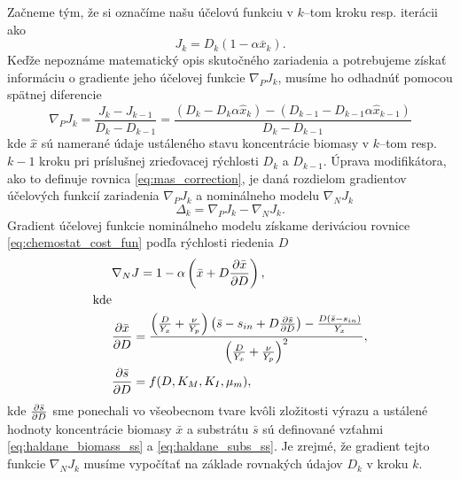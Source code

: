 Začneme tým, že si označíme našu účelovú funkciu v $ k $--tom kroku resp. iterácii ako
\begin{equation}
\label{eq:chemostat_cost_fun}
	J_{k} = D_{k}\left(1-\alpha\bar{x}_{k}\right).
\end{equation}
Keďže nepoznáme matematický opis skutočného zariadenia a potrebujeme získať informáciu o gradiente jeho účelovej funkcie $ \nabla_{P}J_{k} $, musíme ho odhadnúť pomocou spätnej diferencie
\begin{equation}
	\nabla_{P}J_{k} = \frac{J_{k} - J_{k-1}}{D_{k} - D_{k-1}} =
	\frac{\left(D_{k}-D_{k}\alpha\hat{x}_{k}\right) - \left(D_{k-1}-D_{k-1}\alpha\hat{x}_{k-1}\right)}{D_{k} - D_{k-1}}
\end{equation}
kde $ \hat{x} $ sú namerané údaje ustáleného stavu koncentrácie biomasy v $ k $--tom resp. $ k-1 $ kroku pri príslušnej zrieďovacej rýchlosti $ D_{k} $ a $ D_{k-1} $. Úprava modifikátora, ako to definuje rovnica \eqref{eq:mas_correction}, je daná rozdielom gradientov účelových funkcií zariadenia $ \nabla_{P}J_{k} $ a nominálneho modelu $ \nabla_{N}J_{k} $ 
\begin{equation}
\label{eq:mas_chemostat_modifierValue}
	\Delta_k = \nabla_{P}J_{k} - \nabla_{N}J_{k}.
\end{equation}
Gradient účelovej funkcie nominálneho modelu získame deriváciou rovnice \eqref{eq:chemostat_cost_fun} podľa rýchlosti riedenia $ D $
\begin{align}
	&\nabla_{N}J = 1 - \alpha\left(\bar{x}+D\frac{\partial \bar{x}}{\partial D}\right),\\
	\text{kde} & \notag\\
	&\frac{\partial \bar{x}}{\partial D} = \frac{\left(\frac{D}{Y_{x}} + \frac{\nu}{Y_{p}}\right)\left(\bar{s}-s_{in}+D\frac{\partial \bar{s}}{\partial D}\right) - \frac{D\left(\bar{s}-s_{in}\right)}{Y_{x}}}{\left(\frac{D}{Y_{x}} + \frac{\nu}{Y_{p}}\right)^2},	\\
	&\frac{\partial \bar{s}}{\partial D} = f(D,K_{M},K_{I},\mu_{m}),
\end{align}
kde $ \frac{\partial \bar{s}}{\partial D} $ sme ponechali vo všeobecnom tvare kvôli zložitosti výrazu a ustálené hodnoty koncentrácie biomasy $ \bar{x} $ a substrátu $ \bar{s} $ sú definované vzťahmi \eqref{eq:haldane_biomass_ss} a \eqref{eq:haldane_subs_ss}. Je zrejmé, že gradient tejto funkcie $ \nabla_{N}J_{k} $ musíme vypočítať na základe rovnakých údajov $ D_k $ v kroku $ k $. 

